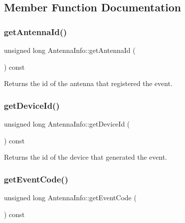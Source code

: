 \subsection{Member Function Documentation}
\mbox{\label{class_antenna_info_a1aee619b1f3d45e3da945f17d8531bbf}} 
\subsubsection{\texorpdfstring{get\+Antenna\+Id()}{getAntennaId()}}
{\footnotesize\ttfamily unsigned long Antenna\+Info\+::get\+Antenna\+Id (\begin{DoxyParamCaption}{ }\end{DoxyParamCaption}) const}

\begin{DoxyReturn}{Returns}
the id of the antenna that registered the event. 
\end{DoxyReturn}
\mbox{\label{class_antenna_info_a25a6a3ca6afeba45c00f2312b8d2d9de}} 
\subsubsection{\texorpdfstring{get\+Device\+Id()}{getDeviceId()}}
{\footnotesize\ttfamily unsigned long Antenna\+Info\+::get\+Device\+Id (\begin{DoxyParamCaption}{ }\end{DoxyParamCaption}) const}

\begin{DoxyReturn}{Returns}
the id of the device that generated the event. 
\end{DoxyReturn}
\mbox{\label{class_antenna_info_a898d46ed6fd2676e370ae8c325ffd679}} 
\subsubsection{\texorpdfstring{get\+Event\+Code()}{getEventCode()}}
{\footnotesize\ttfamily unsigned long Antenna\+Info\+::get\+Event\+Code (\begin{DoxyParamCaption}{ }\end{DoxyParamCaption}) const}

